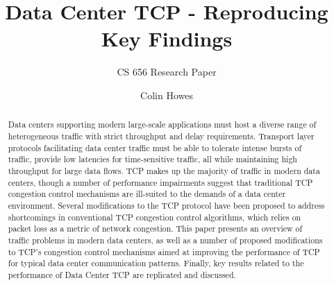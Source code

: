 \documentclass[sigconf]{acmart}
\begin{document}
\title{Data Center TCP - Reproducing Key Findings}
\subtitle{CS 656 Research Paper}

\author{Colin Howes}

\begin{abstract}

Data centers supporting modern large-scale applications must host a diverse range of heterogeneous traffic with strict throughput and delay requirements. Transport layer protocols facilitating data center traffic must be able to tolerate intense bursts of traffic, provide low latencies for time-sensitive traffic, all while maintaining high throughput for large data flows. TCP makes up the majority of traffic in modern data centers, though a number of performance impairments suggest that traditional TCP congestion control mechanisms are ill-suited to the demands of a data center environment. Several modifications to the TCP protocol have been proposed to address shortcomings in conventional TCP congestion control algorithms, which relies on packet loss as a metric of network congestion. This paper presents an overview of traffic problems in modern data centers, as well as a number of proposed modifications to TCP's congestion control mechanisms aimed at improving the performance of TCP for typical data center communication patterns. Finally, key results related to the performance of Data Center TCP are replicated and discussed.

\end{abstract}

\maketitle




 
\end{document}
